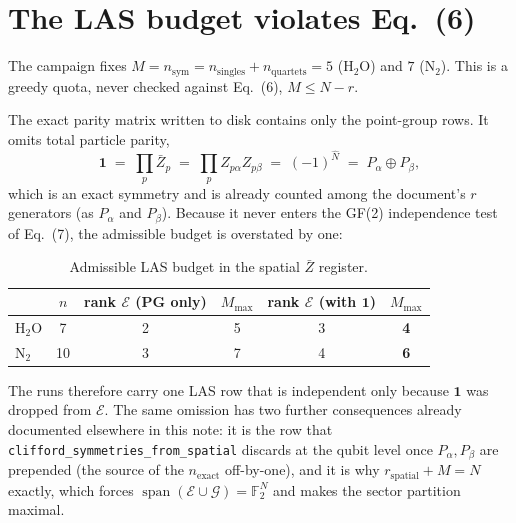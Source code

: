 %

\section{The LAS budget violates Eq.~(6)}
\label{sec:budget-defect}

The campaign fixes $M = n_{\mathrm{sym}} = n_{\mathrm{singles}} +
n_{\mathrm{quartets}} = 5$ ($\mathrm{H_2O}$) and $7$ ($\mathrm{N_2}$). This is a
greedy quota, never checked against Eq.~(6), $M \le N - r$.

The exact parity matrix written to disk contains only the point-group rows. It
omits total particle parity,
\begin{equation}
\mathbf{1} \;=\; \prod_p \bar Z_p \;=\; \prod_p Z_{p\alpha} Z_{p\beta}
\;=\; (-1)^{\hat N} \;=\; P_\alpha \oplus P_\beta ,
\end{equation}
which is an exact symmetry and is already counted among the document's $r$
generators (as $P_\alpha$ and $P_\beta$). Because it never enters the GF(2)
independence test of Eq.~(7), the admissible budget is overstated by one:

\begin{table}[htbp]
\centering
\caption{Admissible LAS budget in the spatial $\bar Z$ register.}
\label{tab:budget}
\begin{tabular}{lccccc}
\toprule
 & $n$ & rank $\mathcal E$ (PG only) & $M_{\max}$ & rank $\mathcal E$ (with $\mathbf 1$) & $M_{\max}$ \\
\midrule
$\mathrm{H_2O}$ & 7  & 2 & 5 & 3 & \textbf{4} \\
$\mathrm{N_2}$  & 10 & 3 & 7 & 4 & \textbf{6} \\
\bottomrule
\end{tabular}
\end{table}

The runs therefore carry one LAS row that is independent only because
$\mathbf 1$ was dropped from $\mathcal E$. The same omission has two further
consequences already documented elsewhere in this note: it is the row that
\texttt{clifford\_symmetries\_from\_spatial} discards at the qubit level once
$P_\alpha, P_\beta$ are prepended (the source of the $n_{\mathrm{exact}}$
off-by-one), and it is why $r_{\mathrm{spatial}} + M = N$ exactly, which forces
$\operatorname{span}(\mathcal E \cup \mathcal G) = \mathbb F_2^{N}$ and makes
the sector partition maximal.

